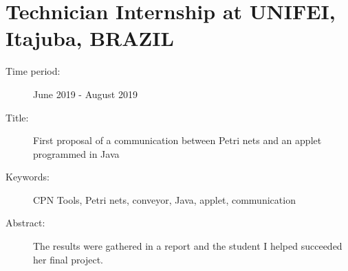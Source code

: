 \documentclass[a4paper,10pt]{article}
\begin{document}
\section{Technician Internship at UNIFEI, Itajuba, BRAZIL}
\begin{description}
    \item[Time period:] June 2019 - August 2019
    \item[Title:]  First proposal of a communication between Petri nets and an applet programmed in Java
    \item[Keywords:] CPN Tools, Petri nets, conveyor, Java, applet, communication
    \item[Abstract:] %

          The results were gathered in a report and the student I helped succeeded her final project.
\end{description}







\end{document}
